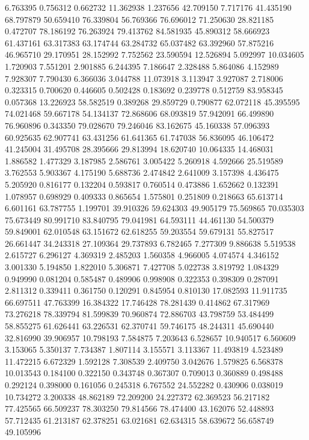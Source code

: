 6.763395
0.756312
0.662732
11.362938
1.237656
42.709150
7.717176
41.435190
68.797879
50.659410
76.339804
56.769366
76.696012
71.250630
28.821185
0.472707
78.186192
76.263924
79.413762
84.581935
45.890312
58.666923
61.437161
63.317383
63.174744
63.284732
65.037482
63.392960
57.875216
46.965710
29.170951
28.152992
7.752562
23.590594
12.526894
5.092997
10.034605
1.720903
7.551201
2.901885
6.244395
7.186647
2.328488
5.864086
4.152989
7.928307
7.790430
6.366036
3.044788
11.073918
3.113947
3.927087
2.718006
0.323315
0.700620
0.446605
0.502428
0.183692
0.239778
0.512759
83.958345
0.057368
13.226923
58.582519
0.389268
29.859729
0.790877
62.072118
45.395595
74.021468
59.667178
54.134137
72.868606
68.093819
57.942091
66.499890
76.960896
0.343350
79.028670
79.246046
83.162675
45.160338
57.096393
60.925635
62.907741
63.431256
61.641365
61.747038
56.836095
46.106472
41.245004
31.495708
28.395666
29.813994
18.620740
10.064335
14.468031
1.886582
1.477329
3.187985
2.586761
3.005422
5.260918
4.592666
25.519589
3.762553
5.903367
4.175190
5.688736
2.474842
2.641009
3.157398
4.436475
5.205920
0.816177
0.132204
0.593817
0.760514
0.473886
1.652662
0.132391
1.078957
0.698929
0.409333
0.865654
1.575801
0.251809
0.218663
65.613714
6.601161
63.787755
1.199701
39.910326
59.624303
49.905179
75.569865
70.035303
75.673449
80.991710
83.840795
79.041981
64.593111
44.461130
54.500379
59.849001
62.010548
63.151672
62.618255
59.203554
59.679131
55.827517
26.661447
34.243318
27.109364
29.737893
6.782465
7.277309
9.886638
5.519538
2.615727
6.296127
4.369319
2.485203
1.560358
4.966005
4.074574
4.346152
3.001330
5.194850
1.822010
5.306871
7.427708
5.022738
3.819792
1.084329
0.949990
0.081204
0.585487
0.489906
0.998908
0.322353
0.398309
0.287091
2.811312
0.339411
0.361750
0.120291
0.845954
0.810130
17.082593
11.911735
66.697511
47.763399
16.384322
17.746428
78.281439
0.414862
67.317969
73.276218
78.339794
81.599839
70.960874
72.886703
43.798759
53.484499
58.855275
61.626441
63.226531
62.370741
59.746175
48.244311
45.690440
32.816990
39.906957
10.798193
7.584875
7.203643
6.528657
10.940517
6.560609
3.153065
5.350137
7.734387
1.807114
3.155571
3.113367
11.493819
4.523489
11.472215
6.672329
1.592128
7.308539
2.409750
3.042676
1.579825
6.568378
10.013543
0.184100
0.322150
0.343748
0.367307
0.709013
0.360889
0.498488
0.292124
0.398000
0.161056
0.245318
6.767552
24.552282
0.430906
0.038019
10.734272
3.200338
48.862189
72.209200
24.227372
62.369523
56.217182
77.425565
66.509237
78.303250
79.814566
78.474400
43.162076
52.448893
57.712435
61.213187
62.378251
63.021681
62.634315
58.639672
56.658749
49.105996
